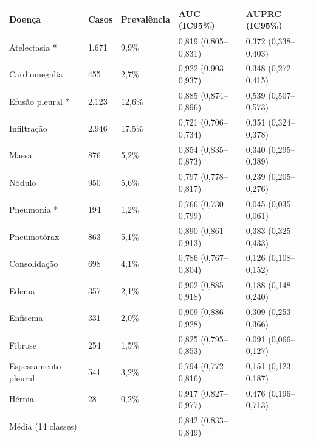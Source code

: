 \begin{tabular}{lllll}
\toprule
Doença & Casos & Prevalência & AUC (IC95\%) & AUPRC (IC95\%) \\
\midrule
Atelectasia * & 1.671 & 9,9\% & 0,819 (0,805–0,831) & 0,372 (0,338–0,403) \\
Cardiomegalia & 455 & 2,7\% & 0,922 (0,903–0,937) & 0,348 (0,272–0,415) \\
Efusão pleural * & 2.123 & 12,6\% & 0,885 (0,874–0,896) & 0,539 (0,507–0,573) \\
Infiltração & 2.946 & 17,5\% & 0,721 (0,706–0,734) & 0,351 (0,324–0,378) \\
Massa & 876 & 5,2\% & 0,854 (0,835–0,873) & 0,340 (0,295–0,389) \\
Nódulo & 950 & 5,6\% & 0,797 (0,778–0,817) & 0,239 (0,205–0,276) \\
Pneumonia * & 194 & 1,2\% & 0,766 (0,730–0,799) & 0,045 (0,035–0,061) \\
Pneumotórax & 863 & 5,1\% & 0,890 (0,861–0,913) & 0,383 (0,325–0,433) \\
Consolidação & 698 & 4,1\% & 0,786 (0,767–0,804) & 0,126 (0,108–0,152) \\
Edema & 357 & 2,1\% & 0,902 (0,885–0,918) & 0,188 (0,148–0,240) \\
Enfisema & 331 & 2,0\% & 0,909 (0,886–0,928) & 0,309 (0,253–0,366) \\
Fibrose & 254 & 1,5\% & 0,825 (0,795–0,853) & 0,091 (0,066–0,127) \\
Espessamento pleural & 541 & 3,2\% & 0,794 (0,772–0,816) & 0,151 (0,123–0,187) \\
Hérnia & 28 & 0,2\% & 0,917 (0,827–0,977) & 0,476 (0,196–0,713) \\
Média (14 classes) &  &  & 0,842 (0,833–0,849) &  \\
\bottomrule
\end{tabular}
